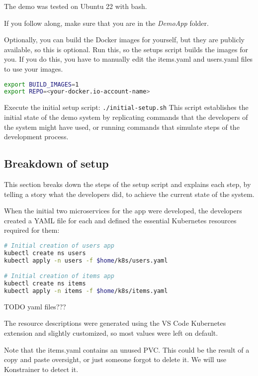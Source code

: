 The demo was tested on Ubuntu 22 with bash.

If you follow along, make sure that you are in the \emph{DemoApp} folder.

Optionally, you can build the Docker images for yourself, but they are publicly available, so this is optional. Run this, so the setups script builds the images for you. If you do this, you have to manually edit the items.yaml and users.yaml files to use your images.

\begin{lstlisting}[caption={Optional: Build images},language=bash,label=code:bash1]
export BUILD_IMAGES=1
export REPO=<your-docker.io-account-name>
\end{lstlisting}

Execute the initial setup script: \texttt{./initial-setup.sh} This script establishes the initial state of the demo system by replicating commands that the developers of the system might have used, or running commands that simulate steps of the development process.

\subsection{Breakdown of setup}

This section breaks down the steps of the setup script and explains each step, by telling a story what the developers did, to achieve the current state of the system.

When the initial two microservices for the app were developed, the developers created a YAML file for each and defined the essential Kubernetes resources required for them:

\begin{lstlisting}[caption={Create first deployment},language=bash,label=code:bash3]
# Initial creation of users app
kubectl create ns users
kubectl apply -n users -f $home/k8s/users.yaml

# Initial creation of items app
kubectl create ns items
kubectl apply -n items -f $home/k8s/items.yaml
\end{lstlisting}

TODO yaml files???

The resource descriptions were generated using the VS Code Kubernetes extension and slightly customized, so most values were left on default.

Note that the items.yaml contains an unused PVC. This could be the result of a copy and paste oversight, or just someone forgot to delete it. We will use Konstrainer to detect it.

